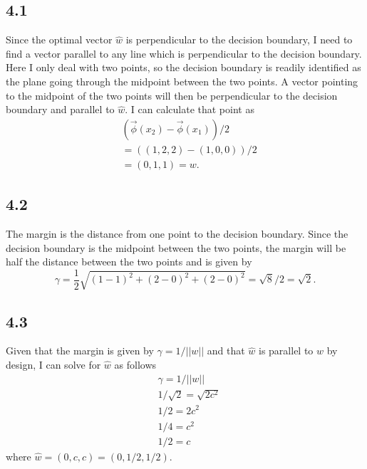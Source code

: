 \documentclass[12pt]{amsart}
\begin{document}
\subsection*{4.1}
Since the optimal vector $\hat{w}$ is perpendicular to the decision boundary, I need to find a vector parallel to any line which is perpendicular to the decision boundary.  Here I only deal with two points, so the decision boundary is readily identified as the plane going through the midpoint between the two points.  A vector pointing to the midpoint of the two points will then be perpendicular to the decision boundary and parallel to $\hat{w}$.  I can calculate that point as 
\begin{equation}
\begin{split}
& (\vec{\phi}(x_2) - \vec{\phi}(x_1))/2 \\
& = ((1,2,2) - (1,0,0))/2 \\
& = (0,1,1) = w.
\end{split}
\end{equation}

\subsection*{4.2}
The margin is the distance from one point to the decision boundary.  Since the decision boundary is the midpoint between the two points, the margin will be half the distance between the two points and is given by
\begin{equation}
\gamma = \frac{1}{2}\sqrt{(1-1)^2 + (2-0)^2 + (2-0)^2} = \sqrt{8}/2 = \sqrt{2}.
\end{equation}

\subsection*{4.3}
Given that the margin is given by $\gamma = 1/||w||$ and that $\hat{w}$ is parallel to $w$ by design, I can solve for $\hat{w}$ as follows
\begin{equation}
\begin{split}
& \gamma = 1/||w|| \\
& 1/\sqrt{2} = \sqrt{2c^2} \\ 
& 1/2 = 2c^2 \\
& 1/4 = c^2 \\
& 1/2 = c 
\end{split}
\end{equation}
where $\hat{w} = (0,c,c) = (0,1/2,1/2)$.
\end{document}
